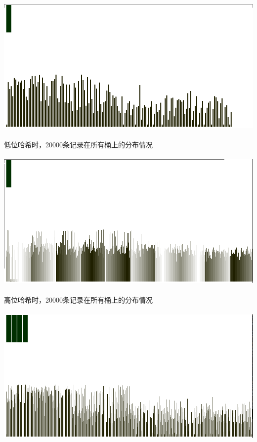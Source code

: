 \documentclass{article}
\begin{document}
        \paragraph{}\includegraphics[scale=0.5]{pic5000_h.png}
        \paragraph{}
            低位哈希时，20000条记录在所有桶上的分布情况
        \paragraph{}\includegraphics[scale=0.5]{pic20000_l.png}
        \paragraph{}
            高位哈希时，20000条记录在所有桶上的分布情况
        \paragraph{}\includegraphics[scale=0.5]{pic20000_h.png}
\end{document}
